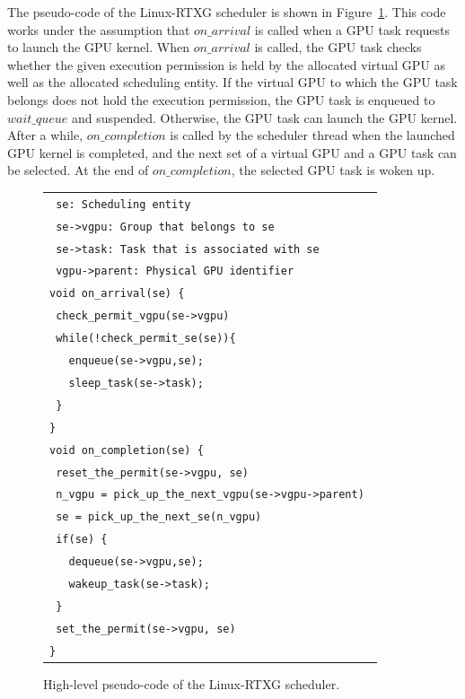 The pseudo-code of the Linux-RTXG scheduler is shown in Figure~\ref{fig:scheduling}.
This code works under the assumption that $on\_arrival$ is called when a GPU task requests to launch the GPU kernel.
When $on\_arrival$ is called, the GPU task checks whether the given execution permission is held by the allocated virtual GPU as well as the allocated scheduling entity.
If the virtual GPU to which the GPU task belongs does not hold the execution permission, the GPU task is enqueued to $wait\_queue$ and suspended.
Otherwise, the GPU task can launch the GPU kernel.
After a while, $on\_completion$ is called by the scheduler thread when the launched GPU kernel is completed, and the next set of a virtual GPU and a GPU task can be selected.
At the end of $on\_completion$, the selected GPU task is woken up.

\begin{figure}[!t]
\begin{center}
\begin{tabular}{l}
\hline
{\scriptsize \verb| se: Scheduling entity |}\\
{\scriptsize \verb| se->vgpu: Group that belongs to se|}\\
{\scriptsize \verb| se->task: Task that is associated with se |}\\
{\scriptsize \verb| vgpu->parent: Physical GPU identifier|}\\
\hline
{\scriptsize \verb|void on_arrival(se) {|}\\
{\scriptsize \verb| check_permit_vgpu(se->vgpu)    |}\\
{\scriptsize \verb| while(!check_permit_se(se)){|}\\
{\scriptsize \verb|   enqueue(se->vgpu,se); |}\\
{\scriptsize \verb|   sleep_task(se->task); |}\\
{\scriptsize \verb| }|}\\
{\scriptsize \verb|}|}\\
{\scriptsize \verb|void on_completion(se) {|}\\
{\scriptsize \verb| reset_the_permit(se->vgpu, se)|}\\
{\scriptsize \verb| n_vgpu = pick_up_the_next_vgpu(se->vgpu->parent) |}\\
{\scriptsize \verb| se = pick_up_the_next_se(n_vgpu)|}\\
{\scriptsize \verb| if(se) {|}\\
{\scriptsize \verb|   dequeue(se->vgpu,se);|}\\
{\scriptsize \verb|   wakeup_task(se->task);|}\\
{\scriptsize \verb| }|}\\
{\scriptsize \verb| set_the_permit(se->vgpu, se)|}\\
{\scriptsize \verb|}|}\\
\hline
\end{tabular}
\caption{High-level pseudo-code of the Linux-RTXG scheduler.}
\vspace{-4mm}
\label{fig:scheduling}
\end{center}
\end{figure}

